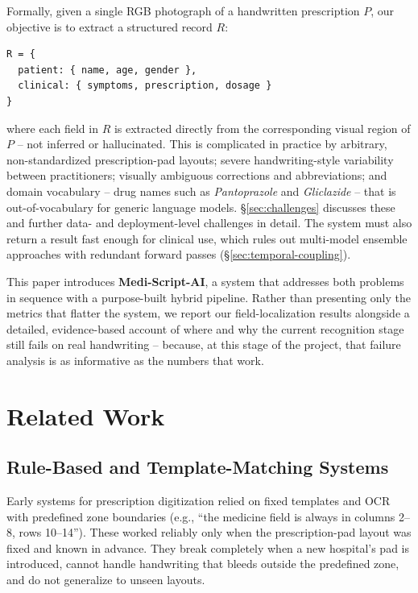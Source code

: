 \documentclass[conference]{IEEEtran}
\begin{document}
Formally, given a single RGB photograph of a handwritten prescription $P$, our objective is to extract a structured record $R$:

\begin{lstlisting}
R = {
  patient: { name, age, gender },
  clinical: { symptoms, prescription, dosage }
}
\end{lstlisting}
\label{sec:record}

where each field in $R$ is extracted directly from the corresponding visual region of $P$ -- not inferred or hallucinated. This is complicated in practice by arbitrary, non-standardized prescription-pad layouts; severe handwriting-style variability between practitioners; visually ambiguous corrections and abbreviations; and domain vocabulary -- drug names such as \emph{Pantoprazole} and \emph{Gliclazide} -- that is out-of-vocabulary for generic language models. \S\ref{sec:challenges} discusses these and further data- and deployment-level challenges in detail. The system must also return a result fast enough for clinical use, which rules out multi-model ensemble approaches with redundant forward passes (\S\ref{sec:temporal-coupling}).

This paper introduces \textbf{Medi-Script-AI}, a system that addresses both problems in sequence with a purpose-built hybrid pipeline. Rather than presenting only the metrics that flatter the system, we report our field-localization results alongside a detailed, evidence-based account of where and why the current recognition stage still fails on real handwriting -- because, at this stage of the project, that failure analysis is as informative as the numbers that work.

\section{Related Work}
\label{sec:related}

\subsection{Rule-Based and Template-Matching Systems}

Early systems for prescription digitization relied on fixed templates and OCR with predefined zone boundaries (e.g., ``the medicine field is always in columns 2--8, rows 10--14''). These worked reliably only when the prescription-pad layout was fixed and known in advance. They break completely when a new hospital's pad is introduced, cannot handle handwriting that bleeds outside the predefined zone, and do not generalize to unseen layouts.
\end{document}
